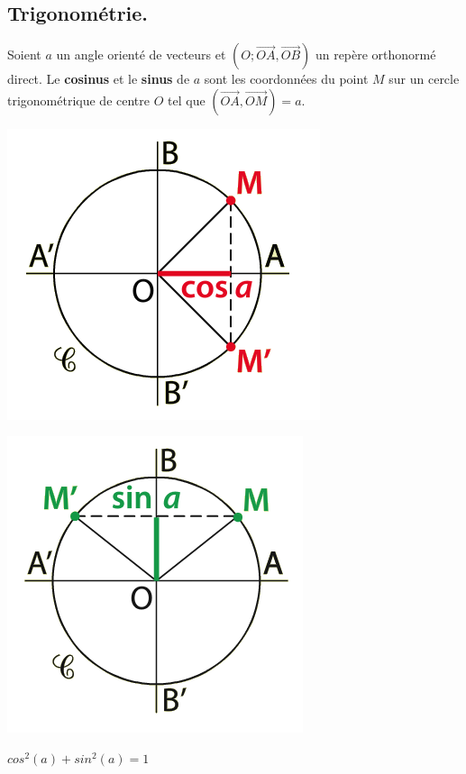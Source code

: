 \documentclass[a4paper,11pt]{article}
\theoremstyle{break}
\begin{document}
 \subsection{Trigonométrie.}
 \begin{definition}
 Soient $a$ un angle orienté de vecteurs et $(O;\vec{OA},\vec{OB})$ un repère orthonormé direct. 
 Le \textbf{cosinus} et le \textbf{sinus} de $a$ sont les coordonnées du point $M$ sur un cercle trigonométrique de centre $O$
 tel que $(\vec{OA},\vec{OM})=a$.
  \begin{multicols}{2}
  
  
  \begin{center}
    \includegraphics[scale=0.5]{../Images/cosinus.png}
  \end{center}
  
  \columnbreak 
  
  
  \begin{center}
    \includegraphics[scale=0.5]{../Images/sinus.png}
  \end{center}

  \end{multicols}
  \begin{center}
   $cos^2(a)+sin^2(a)=1$
  \end{center}

 \end{definition}
 
\end{document}
